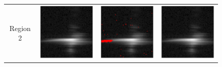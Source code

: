 \documentclass[10pt,letterpaper]{article}
\begin{document}
\begin{figure}
\begin{tabular}{c c c c}
						Region 2 & \includegraphics[width=1.75in]{fig/orig_2} & \includegraphics[width=1.75in]{fig/despike_2} & \includegraphics[width=1.75in]{fig/dspk_2} \\
					\end{tabular}
					
				\end{figure}
				
\end{document}
